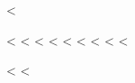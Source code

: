 <%
\setlength{\evensidemargin}{-24pt}
\setlength{\oddsidemargin}{-24pt}


\setcounter{secnumdepth}{3}    %
\setcounter{tocdepth}{2}       %

<%
<%
\ifpdftex
<%
<%
<%
<%
<%
<%
\fi
<%

<%
<%

\usepackage{calc}

\newcommand*\Descriptionlabel[1]{%
  \raisebox{0pt}[1ex][0pt]{
    \makebox[\labelwidth][1]{
      \parbox[t]{\labelwidth}{
        \hspace{0pt}\textbf{#1:}}}}
}

\newcommand*\Descriptionlabelx[1]{%
  \parbox[t]{\textwidth}{
    \textbf{#1}\\\mbox{}}
}

\newenvironment{Description}{
  \begin{list}{}{
    \let\makelabel\Descriptionlabelx
    \setlength\labelwidth{1em}
    \setlength\leftmargin{\labelwidth+\labelsep}
  }
}
{
  \end{list}
}

\usepackage[inline]{enumitem}


